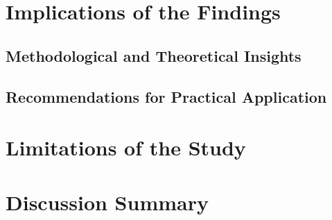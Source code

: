 
\section{Implications of the Findings}
\label{sec:discussion_implications} %

\subsection{Methodological and Theoretical Insights}
\label{sec:implications_theoretical} %

\subsection{Recommendations for Practical Application}
\label{sec:implications_practical} %

\section{Limitations of the Study}
\label{sec:discussion_limitations} %

\section{Discussion Summary}
\label{sec:discussion_summary}
